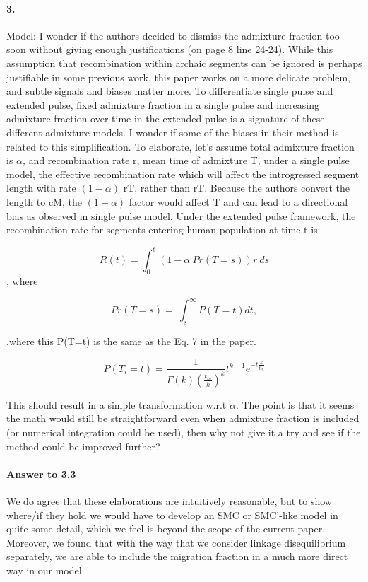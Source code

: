 \documentclass[11pt]{article}
\let\oldparagraph\paragraph
\renewcommand{\paragraph}[1]{\oldparagraph{#1}\mbox{}}
\begin{document}
\paragraph{3.}
Model: I wonder if the authors decided to dismiss the admixture fraction too soon without giving enough justifications (on page 8 line 24-24). While this assumption that recombination within archaic segments can be ignored is perhaps justifiable in some previous work, this paper works on a more delicate problem, and subtle signals and biases matter more. To differentiate single pulse and extended pulse, fixed admixture fraction in a single pulse and increasing admixture fraction over time in the extended pulse is a signature of these different admixture models. I wonder if some of the biases in their method is related to this simplification. To elaborate, let’s assume total admixture fraction is $\alpha$, and recombination rate r, mean time of admixture T, under a single pulse model, the effective recombination rate which will affect the introgressed segment length with rate $(1-\alpha)$ rT, rather than rT. Because the authors convert the length to cM, the $(1-\alpha)$ factor would affect T and can lead to a directional bias as observed in single pulse model. Under the extended pulse framework, the recombination rate for segments entering human population at time t is:


$$R(t) = \int_{0}^{t}{\left(1-\alpha\ Pr(T=s)\right)r\ ds}$$,
 where 

$$Pr\left(T=s\right)=\ \int_{s}^{\infty}P\left(T=t\right)dt,$$

,where this P(T=t) is the same as the Eq. 7 in the paper.
 
$$  P(T_i=t)=\frac{1}{\Gamma(k)(\frac{t_m}{k})^k}t^{k-1}e^{-t\frac{k}{t_m}}$$
 
This should result in a simple transformation w.r.t $\alpha$. The point is that it seems the math would still be straightforward even when admixture fraction is included (or numerical integration could be used), then why not give it a try and see if the method could be improved further?

\paragraph{Answer to 3.3}
We do agree that these elaborations are intuitively reasonable, but to show where/if they hold we would have to develop an SMC or SMC'-like model in quite some detail, which we feel is beyond the scope of the current paper. Moreover, we found that with the way that we consider linkage disequilibrium separately, we are able to include the migration fraction in a much more direct way in our model. 
\end{document}
